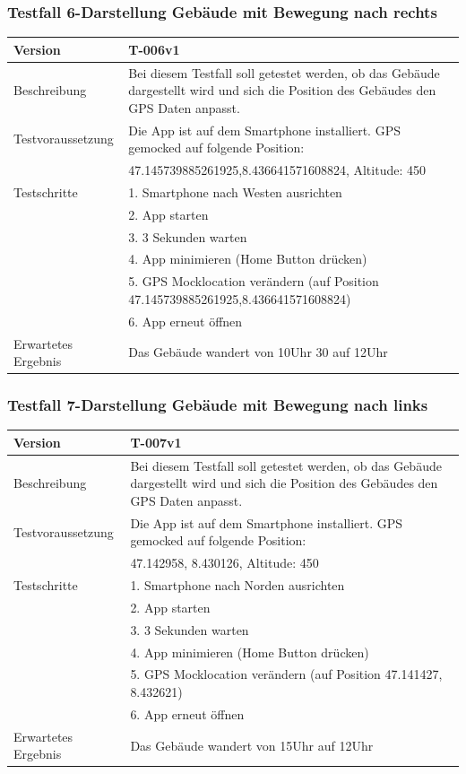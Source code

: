 \documentclass[a4paper]{scrreprt}
\begin{document}
\subsubsection{Testfall 6-Darstellung Gebäude mit Bewegung nach rechts}
\begin{tabularx}{\textwidth}{|l|X|}
\hline 
	Version &
	T-006v1 \\ 
\hline 
	Beschreibung & 
	Bei diesem Testfall soll getestet werden, ob das Gebäude dargestellt wird und sich die Position des Gebäudes den GPS Daten anpasst. \\ 
\hline 
	Testvoraussetzung &
	Die App ist auf dem Smartphone installiert. GPS gemocked auf folgende Position: \\ &
		47.145739885261925,8.436641571608824, Altitude: 450 \\ 
\hline 
	Testschritte & 
		1. Smartphone nach Westen ausrichten \\ &
		2. App starten \\ &
		3. 3 Sekunden warten \\ &
		4. App minimieren (Home Button drücken) \\ &
		5. GPS Mocklocation verändern (auf Position 47.145739885261925,8.436641571608824) \\ &
		6. App erneut öffnen \\
\hline
	Erwartetes Ergebnis &
	Das Gebäude wandert von 10Uhr 30 auf 12Uhr \\ 
\hline 
\end{tabularx}
\subsubsection{Testfall 7-Darstellung Gebäude mit Bewegung nach links}
\begin{tabularx}{\textwidth}{|l|X|}
\hline 
	Version &
	T-007v1 \\ 
\hline 
	Beschreibung & 
	Bei diesem Testfall soll getestet werden, ob das Gebäude dargestellt wird und sich die Position des Gebäudes den GPS Daten anpasst. \\ 
\hline 
	Testvoraussetzung &
	Die App ist auf dem Smartphone installiert. GPS gemocked auf folgende Position: \\ &
		47.142958, 8.430126, Altitude: 450 \\ 
\hline 
	Testschritte & 
		1. Smartphone nach Norden ausrichten \\ &
		2. App starten \\ &
		3. 3 Sekunden warten \\ &
		4. App minimieren (Home Button drücken) \\ &
		5. GPS Mocklocation verändern (auf Position  47.141427, 8.432621) \\ &
		6. App erneut öffnen \\
\hline
	Erwartetes Ergebnis &
	Das Gebäude wandert von 15Uhr auf 12Uhr \\ 
\hline 
\end{tabularx}
\end{document}
